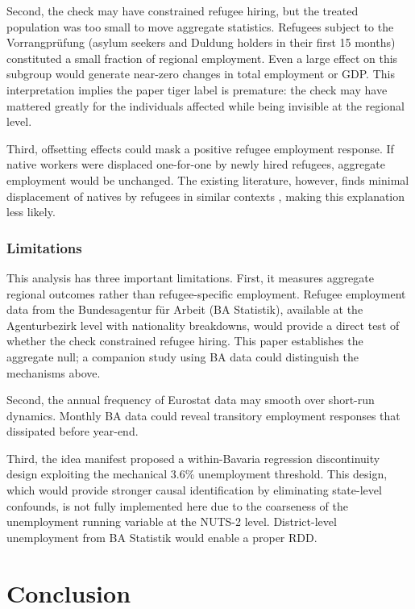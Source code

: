 \documentclass[12pt]{article}
\begin{document}
Second, the check may have constrained refugee hiring, but the treated population was too small to move aggregate statistics. Refugees subject to the Vorrangpr\"ufung (asylum seekers and Duldung holders in their first 15 months) constituted a small fraction of regional employment. Even a large effect on this subgroup would generate near-zero changes in total employment or GDP. This interpretation implies the paper tiger label is premature: the check may have mattered greatly for the individuals affected while being invisible at the regional level.

Third, offsetting effects could mask a positive refugee employment response. If native workers were displaced one-for-one by newly hired refugees, aggregate employment would be unchanged. The existing literature, however, finds minimal displacement of natives by refugees in similar contexts \citep{foged2016, dustmann2016}, making this explanation less likely.

\subsubsection*{Limitations} This analysis has three important limitations. First, it measures aggregate regional outcomes rather than refugee-specific employment. Refugee employment data from the Bundesagentur f\"ur Arbeit (BA Statistik), available at the Agenturbezirk level with nationality breakdowns, would provide a direct test of whether the check constrained refugee hiring. This paper establishes the aggregate null; a companion study using BA data could distinguish the mechanisms above.

Second, the annual frequency of Eurostat data may smooth over short-run dynamics. Monthly BA data could reveal transitory employment responses that dissipated before year-end.

Third, the idea manifest proposed a within-Bavaria regression discontinuity design exploiting the mechanical 3.6\% unemployment threshold. This design, which would provide stronger causal identification by eliminating state-level confounds, is not fully implemented here due to the coarseness of the unemployment running variable at the NUTS-2 level. District-level unemployment from BA Statistik would enable a proper RDD.


\section{Conclusion}
\end{document}
